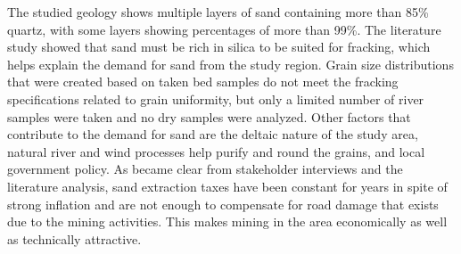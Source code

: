 The studied geology shows multiple layers of sand containing more than 85\% quartz, with some layers showing percentages of more than 99\%. The literature study showed that sand must be rich in silica to be suited for fracking, which helps explain the demand for sand from the study region. Grain size distributions that were created based on taken bed samples do not meet the fracking specifications related to grain uniformity, but only a limited number of river samples were taken and no dry samples were analyzed. Other factors that contribute to the demand for sand are the deltaic nature of the study area, natural river and wind processes help purify and round the grains, and local government policy. As became clear from stakeholder interviews and the literature analysis, sand extraction taxes have been constant for years in spite of strong inflation and are not enough to compensate for road damage that exists due to the mining activities. This makes mining in the area economically as well as technically attractive.

